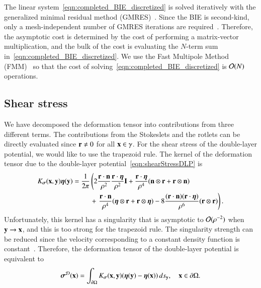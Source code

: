 \documentclass[preprint, 10pt]{elsarticle}
\begin{document}
The linear system~\eqref{eqn:completed_BIE_discretized} is solved
iteratively with the generalized minimal residual method
(GMRES)~\cite{saa-sch1986}.  Since the BIE is second-kind, only a
mesh-independent number of GMRES iterations are
required~\cite{cam-ips-kel-mey-xue1996}.  Therefore, the asymptotic cost
is determined by the cost of performing a matrix-vector multiplication,
and the bulk of the cost is evaluating the $N$-term sum
in~\eqref{eqn:completed_BIE_discretized}. We use the Fast Multipole
Method (FMM)~\cite{gre-rok1987, gre-gre-may1992} so that the cost of
solving~\eqref{eqn:completed_BIE_discretized} is ${\mathcal{O}}(N)$ operations.


\subsection{Shear stress}
\label{sec:shearStress}
We have decomposed the deformation tensor into contributions from three
different terms.  The contributions from the Stokeslets and the rotlets
can be directly evaluated since ${\mathbf{r}} \neq 0$ for all ${\mathbf{x}} \in \gamma$.
For the shear stress of the double-layer potential, we would like to use
the trapezoid rule. The kernel of the deformation tensor due to
the double-layer potential~\eqref{eqn:shearStressDLP} is 
\begin{align*}
  K_{\boldsymbol\sigma}({\mathbf{x}},{\mathbf{y}}){\boldsymbol\eta}({\mathbf{y}}) &= \frac{1}{2\pi} \left(
    2\frac{{\mathbf{r}} \cdot {\mathbf{n}}}{\rho^2} \frac{{\mathbf{r}} \cdot {\boldsymbol\eta}}{\rho^2} {\mathbf{I}} + 
    \frac{{\mathbf{r}} \cdot {\boldsymbol\eta}}{\rho^4} ({\mathbf{n}} \otimes {\mathbf{r}} + {\mathbf{r}} \otimes {\mathbf{n}})
    \right. \\ & \hspace{25pt}+ \left.
    \frac{{\mathbf{r}} \cdot {\mathbf{n}}}{\rho^4} ({\boldsymbol\eta} \otimes {\mathbf{r}} + {\mathbf{r}} \otimes {\boldsymbol\eta}) - 
    8\frac{({\mathbf{r}} \cdot {\mathbf{n}})({\mathbf{r}} \cdot {\boldsymbol\eta})}{\rho^6}({\mathbf{r}} \otimes {\mathbf{r}})
  \right).
\end{align*}
Unfortunately, this kernel has a singularity that is asymptotic to
${\mathcal{O}}(\rho^{-2})$ when ${\mathbf{y}} \rightarrow {\mathbf{x}}$, and this is too strong
for the trapezoid rule.  The singularity strength can be reduced since
the velocity corresponding to a constant density function is
constant~\cite{poz1992}.  Therefore, the deformation tensor of the
double-layer potential is equivalent to
\begin{align*}
  {\boldsymbol\sigma}^{{\mathcal{D}}}({\mathbf{x}}) = \int_{{\partial}\Omega}K_{\boldsymbol\sigma}({\mathbf{x}},{\mathbf{y}})
      ({\boldsymbol\eta}({\mathbf{y}}) - {\boldsymbol\eta}({\mathbf{x}})) \, ds_{{\mathbf{y}}}, \quad {\mathbf{x}} \in {\partial}\Omega.
\end{align*}
\end{document}
